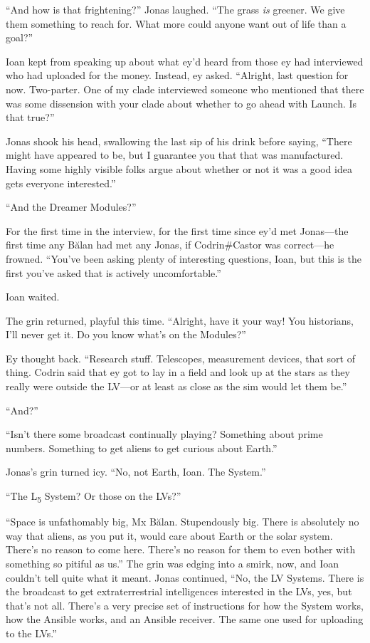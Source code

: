 ``And how is that frightening?'' Jonas laughed. ``The grass \emph{is} greener. We give them something to reach for. What more could anyone want out of life than a goal?''

Ioan kept from speaking up about what ey'd heard from those ey had interviewed who had uploaded for the money. Instead, ey asked. ``Alright, last question for now. Two-parter. One of my clade interviewed someone who mentioned that there was some dissension with your clade about whether to go ahead with Launch. Is that true?''

Jonas shook his head, swallowing the last sip of his drink before saying, ``There might have appeared to be, but I guarantee you that that was manufactured. Having some highly visible folks argue about whether or not it was a good idea gets everyone interested.''

``And the Dreamer Modules?''

For the first time in the interview, for the first time since ey'd met Jonas---the first time any Bălan had met any Jonas, if Codrin\#Castor was correct---he frowned. ``You've been asking plenty of interesting questions, Ioan, but this is the first you've asked that is actively uncomfortable.''

Ioan waited.

The grin returned, playful this time. ``Alright, have it your way! You historians, I'll never get it. Do you know what's on the Modules?''

Ey thought back. ``Research stuff. Telescopes, measurement devices, that sort of thing. Codrin said that ey got to lay in a field and look up at the stars as they really were outside the LV---or at least as close as the sim would let them be.''

``And?''

``Isn't there some broadcast continually playing? Something about prime numbers. Something to get aliens to get curious about Earth.''

Jonas's grin turned icy. ``No, not Earth, Ioan. The System.''

``The L\textsubscript{5} System? Or those on the LVs?''

``Space is unfathomably big, Mx Bălan. Stupendously big. There is absolutely no way that aliens, as you put it, would care about Earth or the solar system. There's no reason to come here. There's no reason for them to even bother with something so pitiful as us.'' The grin was edging into a smirk, now, and Ioan couldn't tell quite what it meant. Jonas continued, ``No, the LV Systems. There is the broadcast to get extraterrestrial intelligences interested in the LVs, yes, but that's not all. There's a very precise set of instructions for how the System works, how the Ansible works, and an Ansible receiver. The same one used for uploading to the LVs.''

